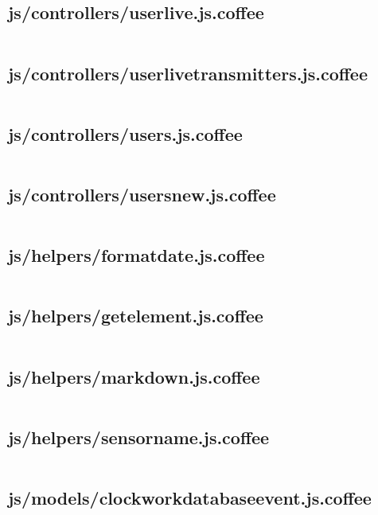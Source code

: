 \documentclass[letterpaper, 12 pt]{article}
\begin{document}
\subsection{js/controllers/user\textunderscore live.js.coffee}
\inputminted{ruby}{../app/assets/javascripts/controllers/user_live.js.coffee}
\subsection{js/controllers/user\textunderscore live\textunderscore transmitters.js.coffee}
\inputminted{ruby}{../app/assets/javascripts/controllers/user_live_transmitters.js.coffee}
\subsection{js/controllers/users.js.coffee}
\inputminted{ruby}{../app/assets/javascripts/controllers/users.js.coffee}
\subsection{js/controllers/users\textunderscore new.js.coffee}
\inputminted{ruby}{../app/assets/javascripts/controllers/users_new.js.coffee}

\subsection{js/helpers/format\textunderscore date.js.coffee}
\inputminted{ruby}{../app/assets/javascripts/helpers/format_date.js.coffee}
\subsection{js/helpers/get\textunderscore element.js.coffee}
\inputminted{ruby}{../app/assets/javascripts/helpers/get_element.js.coffee}
\subsection{js/helpers/markdown.js.coffee}
\inputminted{ruby}{../app/assets/javascripts/helpers/markdown.js.coffee}
\subsection{js/helpers/sensor\textunderscore name.js.coffee}
\inputminted{ruby}{../app/assets/javascripts/helpers/sensor_name.js.coffee}

\subsection{js/models/clockwork\textunderscore database\textunderscore event.js.coffee}
\inputminted{ruby}{../app/assets/javascripts/models/clockwork_database_event.js.coffee}
\end{document}
